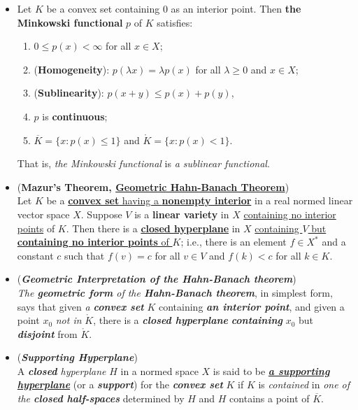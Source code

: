 \documentclass[11pt]{article}
\begin{document}
\begin{itemize}
\item \begin{lemma}
Let $K$ be a convex set containing $0$ as an interior point. Then \textbf{the Minkowski functional} $p$ of $K$ satisfies:
\begin{enumerate}
\item $0 \le p(x) < \infty$ for all $x \in X$;
\item (\textbf{Homogeneity}): $p(\lambda x) = \lambda p(x)$ for all $\lambda \ge 0$ and $x \in X$;
\item (\textbf{Sublinearity}): $p(x + y) \le p(x) + p(y)$,
\item $p$ is \textbf{continuous};
\item $\overline{K} = \{x: p(x) \le 1\}$ and $\mathring{K} = \{x : p(x) < 1\}$.
\end{enumerate}
\end{lemma}
That is, \emph{the Minkowski functional} is \emph{a sublinear functional}.

\item \begin{theorem} (\textbf{Mazur's Theorem, \underline{Geometric Hahn-Banach Theorem}}) \citep{luenberger1997optimization}\\
Let $K$ be a \underline{\textbf{convex set} having a \textbf{nonempty interior}} in a real normed linear vector space $X$. Suppose $V$ is a \textbf{linear variety} in $X$ \underline{containing no interior points} of $K$. Then there is a \underline{\textbf{closed hyperplane}} in $X$ \underline{containing $V$ but \textbf{containing no interior points} of $K$}; i.e., there is an element $f \in X^{*}$ and a constant $c$ such that $f(v) = c$ for all $v \in V$ and $f(k) < c$ for all $k \in K$.
\end{theorem}


\item \begin{remark} (\emph{\textbf{Geometric Interpretation of the Hahn-Banach theorem}})\\
\emph{The \textbf{geometric form} of the \textbf{Hahn-Banach theorem}}, in simplest form, says that given \emph{a \textbf{convex set}} $K$ containing \emph{\textbf{an interior point}}, and given a point $x_0$ \emph{not in} $\mathring{K}$, there is a \emph{\textbf{closed hyperplane}} \emph{\textbf{containing}} $x_0$ but \emph{\textbf{disjoint}} from $\mathring{K}$.
\end{remark}

\item \begin{definition} (\emph{\textbf{Supporting Hyperplane}})\\
A \emph{\textbf{closed} hyperplane} $H$ in a normed space $X$ is said to be \underline{\emph{\textbf{a supporting hyperplane}}} (or a  \emph{\textbf{support}}) for the \emph{\textbf{convex set}} $K$ if $K$ is \emph{contained} in \emph{one of the \textbf{closed half-spaces}} determined by $H$ and $H$ contains a point of $\overline{K}$.
\end{definition}


\end{itemize}
\end{document}
